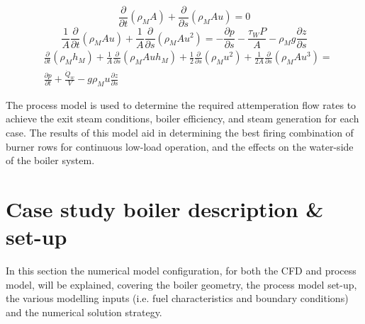 \documentclass[review]{elsarticle}
\begin{document}
\begin{equation}\label{eqn_mix_conti}
\frac{\partial}{\partial t}(\rho_M A)+\frac{\partial}{\partial s}(\rho_MAu) = 0
\end{equation}
\begin{equation}\label{eqn_mix_mom}
\frac{1}{A} \frac{\partial}{\partial t}(\rho_M A u)+\frac{1}{A} \frac{\partial}{\partial s}(\rho_M A u^2) = -\frac{\partial p}{\partial s}-\frac{\tau_W P}{A}- \rho_M g \frac{\partial z}{\partial s}
\end{equation}
\begin{equation}\label{eqn_mix_energy}
\begin{split}
&\frac{\partial}{\partial t}(\rho_Mh_M)+\frac{1}{A}\frac{\partial}{\partial s}(\rho_MAuh_M)+\frac{1}{2}\frac{\partial}{\partial s}(\rho_Mu^2)+\frac{1}{2A}\frac{\partial}{\partial s}(\rho_MAu^3)=\\&\frac{\partial p}{\partial t} + \frac{\dot{Q}_w}{V}-g\rho_Mu\frac{\partial z}{\partial s}
\end{split}
\end{equation}

The process model is used to determine the required attemperation flow rates to achieve the exit steam conditions, boiler efficiency, and steam generation for each case. The results of this model aid in determining the best firing combination of burner rows for continuous low-load operation, and the effects on the water-side of the boiler system.

\section{Case study boiler description \& set-up}
In this section the numerical model configuration, for both the CFD and process model, will be explained, covering the boiler geometry, the process model set-up, the various  modelling inputs (i.e. fuel characteristics and boundary conditions) and the numerical solution strategy.
\end{document}
